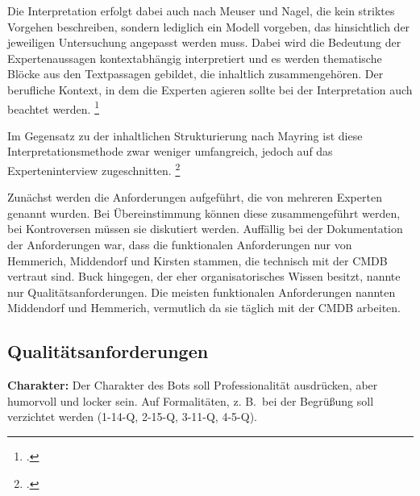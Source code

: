 Die Interpretation erfolgt dabei auch nach Meuser und Nagel, die kein striktes Vorgehen beschreiben, sondern lediglich ein Modell vorgeben, das hinsichtlich der jeweiligen Untersuchung angepasst werden muss.
Dabei wird die Bedeutung der Expertenaussagen kontextabhängig interpretiert und es werden thematische Blöcke aus den Textpassagen gebildet, die inhaltlich zusammengehören.
Der berufliche Kontext, in dem die Experten agieren sollte bei der Interpretation auch beachtet werden.
\footcite[Vgl.][452\psq]{Meuser_1991_Interview}

Im Gegensatz zu der inhaltlichen Strukturierung nach Mayring ist diese Interpretationsmethode zwar weniger umfangreich, jedoch auf das Experteninterview zugeschnitten.
\footcite[Vgl.][103\psq]{Mayring_2015_qualitative_Inhaltsanalyse}

Zunächst werden die Anforderungen aufgeführt, die von mehreren Experten genannt wurden. Bei Übereinstimmung können diese zusammengeführt werden, bei Kontroversen müssen sie diskutiert werden. Auffällig bei der Dokumentation der Anforderungen war, dass die funktionalen Anforderungen nur von Hemmerich, Middendorf und Kirsten stammen, die technisch mit der \acs{CMDB} vertraut sind. Buck hingegen, der eher organisatorisches Wissen besitzt, nannte nur Qualitätsanforderungen. Die meisten funktionalen Anforderungen nannten Middendorf und Hemmerich, vermutlich da sie täglich mit der \acs{CMDB} arbeiten.


\subsection{Qualitätsanforderungen}

\textbf{Charakter:} Der Charakter des Bots soll Professionalität ausdrücken, aber humorvoll und locker sein. Auf Formalitäten, z. B.~bei der Begrüßung soll verzichtet werden (1-14-Q, 2-15-Q, 3-11-Q, 4-5-Q).

